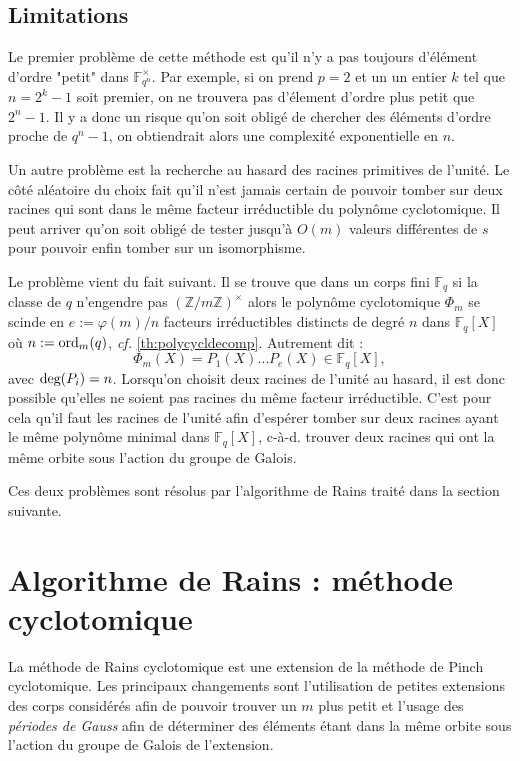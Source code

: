 \documentclass[a4paper]{article} %
\numberwithin{section}{part}
\numberwithin{equation}{section}
\newcommand\zmodninv[1]{(\mathbb{Z}/#1\mathbb{Z})^{\times}}
\newcommand\GF[1]{\mathbb{F}_{#1}}
\newcommand\ord[2]{\textup{ord}_{#1}(#2)}
\begin{document}
\subsection{Limitations}
Le premier problème de cette méthode est qu'il n'y a pas toujours d'élément
d'ordre "petit" dans $\GF{q^n}^{\times}$. Par exemple, si on prend $p = 2$ et un
un entier $k$ tel que $n = 2^k - 1$ soit premier, on ne trouvera pas d'élement 
d'ordre plus petit que $2^n - 1$. Il y a donc un risque qu'on soit obligé de 
chercher des éléments d'ordre proche de $q^n - 1$, on obtiendrait alors une 
complexité exponentielle en $n$.\par
Un autre problème est la recherche au hasard des racines primitives de l'unité. 
Le côté aléatoire du choix fait qu'il n'est jamais certain de pouvoir tomber sur
deux racines qui sont dans le même facteur irréductible du polynôme
cyclotomique. Il peut arriver qu'on soit obligé de tester jusqu'à $O(m)$ valeurs
différentes de $s$ pour pouvoir enfin tomber sur un isomorphisme.\par
Le problème vient du fait suivant. Il se trouve que dans un corps fini $\GF{q}$
si la classe de $q$ n'engendre pas $\zmodninv{m}$ alors le polynôme cyclotomique
$\Phi_m$ se scinde en $e := \varphi(m)/n$ facteurs irréductibles distincts de 
degré $n$ dans $\GF{q}[X]$ où $n := \ord{m}{q}$, \emph{cf.} 
\ref{th:polycycldecomp}. Autrement dit :
\begin{equation}
\Phi_m(X) = P_1(X)\dots P_e(X)\in\GF{q}[X],
\end{equation}
avec $\textup{deg}(P_i) = n$. Lorsqu'on choisit deux racines de l'unité au
hasard, il est donc possible qu'elles ne soient pas racines du même facteur
irréductible. C'est pour cela qu'il faut \fg{} les racines de
l'unité afin d'espérer tomber sur deux racines ayant le même polynôme minimal
dans $\GF{q}[X]$, c-à-d. trouver deux racines qui ont la même orbite sous
l'action du groupe de Galois.\par
Ces deux problèmes sont résolus par l'algorithme de Rains traité dans la section
suivante.
\section{Algorithme de Rains : méthode cyclotomique}
La méthode de Rains cyclotomique est une extension de la méthode de Pinch
cyclotomique. Les principaux changements sont l'utilisation de petites
extensions des corps considérés afin de pouvoir trouver un $m$ plus petit et
l'usage des \emph{périodes de Gauss} afin de déterminer des éléments étant dans 
la même orbite sous l'action du groupe de Galois de l'extension.
\end{document}
